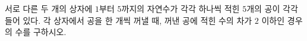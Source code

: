 서로 다른 두 개의 상자에 $1$부터 $5$까지의 자연수가 각각 하나씩 적힌 $5$개의 공이 각각 들어 있다. 각 상자에서 공을 한 개씩 꺼낼 때, 꺼낸 공에 적힌 수의 차가 $2$ 이하인 경우의 수를 구하시오.
